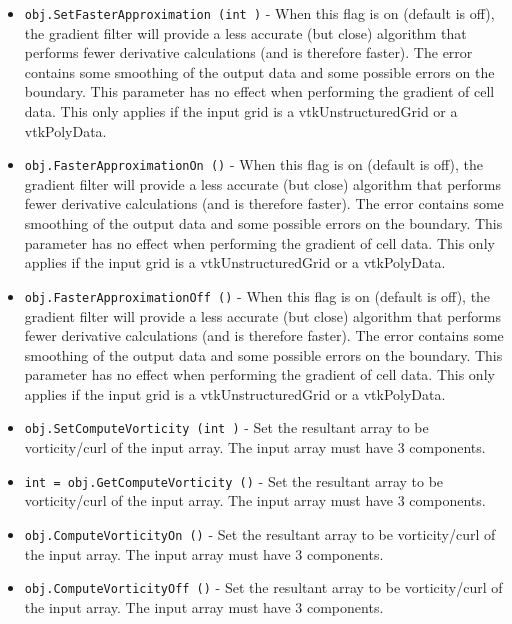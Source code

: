 \begin{itemize}
\item  \verb|obj.SetFasterApproximation (int )| -  When this flag is on (default is off), the gradient filter will provide a
 less accurate (but close) algorithm that performs fewer derivative
 calculations (and is therefore faster).  The error contains some smoothing
 of the output data and some possible errors on the boundary.  This
 parameter has no effect when performing the gradient of cell data.
 This only applies if the input grid is a vtkUnstructuredGrid or a
 vtkPolyData.

\item  \verb|obj.FasterApproximationOn ()| -  When this flag is on (default is off), the gradient filter will provide a
 less accurate (but close) algorithm that performs fewer derivative
 calculations (and is therefore faster).  The error contains some smoothing
 of the output data and some possible errors on the boundary.  This
 parameter has no effect when performing the gradient of cell data.
 This only applies if the input grid is a vtkUnstructuredGrid or a
 vtkPolyData.

\item  \verb|obj.FasterApproximationOff ()| -  When this flag is on (default is off), the gradient filter will provide a
 less accurate (but close) algorithm that performs fewer derivative
 calculations (and is therefore faster).  The error contains some smoothing
 of the output data and some possible errors on the boundary.  This
 parameter has no effect when performing the gradient of cell data.
 This only applies if the input grid is a vtkUnstructuredGrid or a
 vtkPolyData.

\item  \verb|obj.SetComputeVorticity (int )| -  Set the resultant array to be vorticity/curl of the input
 array.  The input array must have 3 components.

\item  \verb|int = obj.GetComputeVorticity ()| -  Set the resultant array to be vorticity/curl of the input
 array.  The input array must have 3 components.

\item  \verb|obj.ComputeVorticityOn ()| -  Set the resultant array to be vorticity/curl of the input
 array.  The input array must have 3 components.

\item  \verb|obj.ComputeVorticityOff ()| -  Set the resultant array to be vorticity/curl of the input
 array.  The input array must have 3 components.

\end{itemize}

